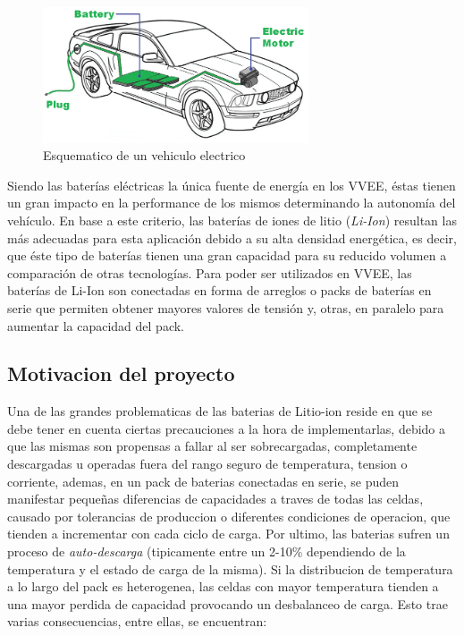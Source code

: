 \documentclass[10pt,a4paper]{article}
\begin{document}
    \begin{figure}[h!]
        \begin{center}
            \includegraphics[width=0.7\textwidth]{EV.png}
            \caption{Esquematico de un vehiculo electrico}
            \label{EV}
        \end{center}
    \end{figure}

	\noindent Siendo las baterías eléctricas la única fuente de energía en los 
    \acrfull{VVEE}, éstas tienen un gran impacto en la performance de los mismos 
    determinando la autonomía del vehículo. En base a este criterio, las 
    baterías de iones de litio (\emph{Li-Ion}) resultan las más adecuadas para 
    esta aplicación debido a su alta densidad energética, es decir, que éste 
    tipo de baterías tienen una gran capacidad para su reducido volumen a 
    comparación de otras tecnologías. Para poder ser utilizados en
    \acrshort{VVEE}, las baterías de Li-Ion son conectadas en forma de arreglos 
    o packs de baterías en serie que permiten obtener mayores valores de tensión
     y, otras, en paralelo para aumentar la capacidad del pack.

    \subsection{Motivacion del proyecto}
	
	\noindent Una de las grandes problematicas de las baterias de Litio-ion 
    reside en que se debe tener en cuenta ciertas precauciones a la hora de
    implementarlas, debido a que las mismas son propensas a fallar al ser 
    sobrecargadas, completamente descargadas u operadas fuera del
    rango seguro de temperatura, tension o corriente, ademas, en un pack de 
    baterias conectadas en serie, se puden manifestar pequeñas diferencias de 
    capacidades a traves de todas las celdas, causado por tolerancias de
    produccion o diferentes condiciones de operacion, que tienden
    a incrementar con cada ciclo de carga. Por ultimo, las baterias
    sufren un proceso de \emph{auto-descarga} (tipicamente entre un
    2-10\% dependiendo de la temperatura y el estado de carga de la misma). 
    Si la distribucion de temperatura a lo largo del pack es
    heterogenea, las celdas con mayor temperatura tienden a una mayor
    perdida de capacidad provocando un desbalanceo de carga.
    Esto trae varias consecuencias, entre ellas, se encuentran:
\end{document}
